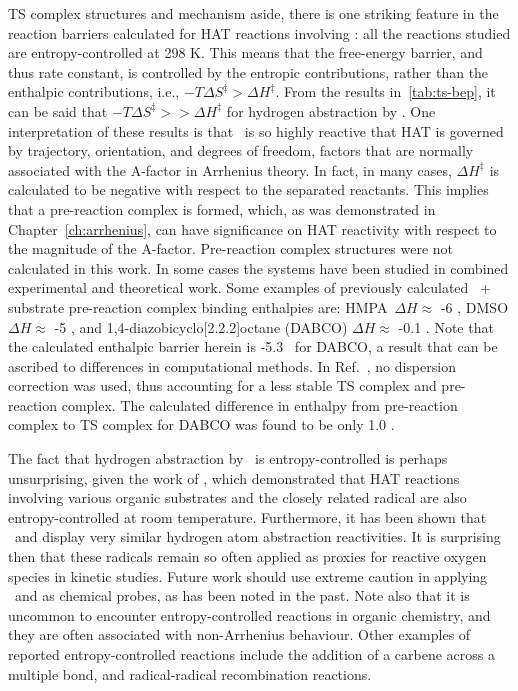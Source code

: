 \begin{doublespace}
TS complex structures and mechanism aside, there is one striking feature in the
reaction barriers calculated for HAT reactions involving \cumo: all the
reactions studied are entropy-controlled at 298 K. This means that the
free-energy barrier, and thus rate constant, is controlled by the entropic
contributions, rather than the enthalpic contributions, i.e., $-T\Delta
S^\ddagger > \Delta H^\ddagger$. From the results in~\ref{tab:ts-bep}, it can
be said that $-T\Delta S^\ddagger >> \Delta H^\ddagger$ for hydrogen
abstraction by \cumo. One interpretation of these results is that \cumo\ is so
highly reactive that HAT is governed by trajectory, orientation, and degrees of
freedom, factors that are normally associated with the A-factor in Arrhenius
theory. In fact, in many cases, $\Delta H^\ddagger$ is calculated to be
negative with respect to the separated reactants. This implies that a
pre-reaction complex is formed, which, as was demonstrated in
Chapter~\ref{ch:arrhenius}, can have significance on HAT reactivity with
respect to the magnitude of the A-factor. Pre-reaction complex structures were
not calculated in this work. In some cases the systems have been
studied in combined experimental and theoretical work. Some examples of
previously calculated \cumo\ + substrate pre-reaction complex binding
enthalpies are: HMPA\footnotemark\ $\Delta H \approx$ -6 \kcalmol, DMSO $\Delta
H \approx$ -5 \kcalmol, and 1,4-diazobicyclo[2.2.2]octane
(DABCO)\cite{Salamone2011b} $\Delta H \approx$ -0.1 \kcalmol. Note that the
calculated enthalpic barrier herein is -5.3 \kcalmol\ for DABCO, a result that
can be ascribed to differences in computational methods. In
Ref.~, no dispersion correction was used, thus
accounting for a less stable TS complex and pre-reaction complex. The
calculated difference in enthalpy from pre-reaction complex to TS complex for
DABCO was found to be only 1.0 \kcalmol.


The fact that hydrogen abstraction by \cumo\ is entropy-controlled is perhaps
unsurprising, given the work of \citet{Finn2004}, which demonstrated that HAT
reactions involving various organic substrates and the closely related radical
 are also entropy-controlled at room temperature. Furthermore, it
has been shown that \cumo\ and  display very similar hydrogen
atom abstraction reactivities.\cite{Salamone2011, Valgimigli1995, Sheeller2001,
Baignee1983} It is surprising then that these radicals remain so often applied
as proxies for reactive oxygen species in kinetic studies. Future work should
use extreme caution in applying \cumo\ and  as chemical probes,
as has been noted in the past.\cite{Finn2004, Salamone2011b, Salamone2011} Note
also that it is uncommon to encounter entropy-controlled reactions in organic
chemistry, and they are often associated with non-Arrhenius behaviour. Other
examples of reported entropy-controlled reactions include the addition of a
carbene across a multiple bond,\cite{Houk1984, Moss2017} and radical-radical
recombination reactions.\cite{Sobek2001}


\end{doublespace}
